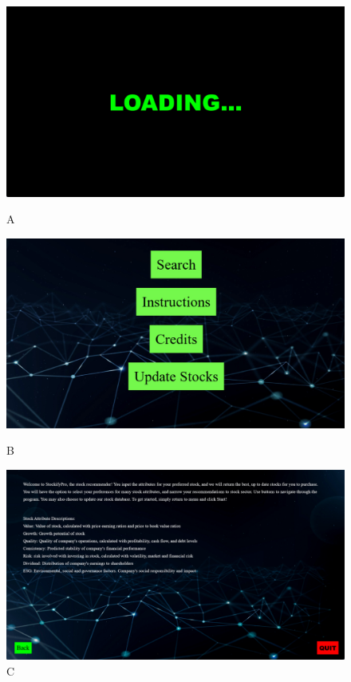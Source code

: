\documentclass[fontsize=12pt]{article}
\begin{document}
\begin{figure}[!htb]
  \includegraphics[width=\linewidth]{img/a.png}
  \caption{A}\label{fig:awesome_image1}
\endminipage\hfill
{}
  \includegraphics[width=\linewidth]{img/b.png}
  \caption{B}\label{fig:awesome_image2}
\endminipage\hfill
{}%
  \includegraphics[width=\linewidth]{img/c.png}
  \caption{C}\label{fig:awesome_image3}
\endminipage
\end{figure}
\end{document}
